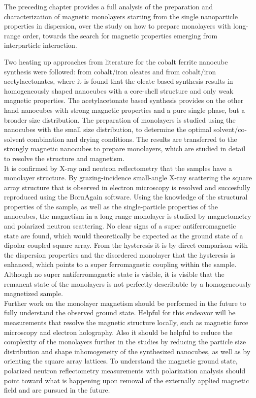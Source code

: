 \documentclass[\main/dresen_thesis.tex]{subfiles}
\begin{document}
  The preceding chapter provides a full analysis of the preparation and characterization of magnetic monolayers starting from the single nanoparticle properties in dispersion, over the study on how to prepare monolayers with long-range order, towards the search for magnetic properties emerging from interparticle interaction.

  Two heating up approaches from literature for the cobalt ferrite nanocube synthesis were followed: from cobalt/iron oleates and from cobalt/iron acetylacetonates, where it is found that the oleate based synthesis results in homogeneously shaped nanocubes with a core-shell structure and only weak magnetic properties.
  The acetylacetonate based synthesis provides on the other hand nanocubes with strong magnetic properties and a pure single phase, but a broader size distribution.
  The preparation of monolayers is studied using the nanocubes with the small size distribution, to determine the optimal solvent/co-solvent combination and drying conditions.
  The results are transferred to the strongly magnetic nanocubes to prepare monolayers, which are studied in detail to resolve the structure and magnetism.
  \\

  It is confirmed by X-ray and neutron reflectometry that the samples have a monolayer structure.
  By grazing-incidence small-angle X-ray scattering the square array structure that is observed in electron microscopy is resolved and succesfully reproduced using the BornAgain software.
  Using the knowledge of the structural properties of the sample, as well as the single-particle properties of the nanocubes, the magnetism in a long-range monolayer is studied by magnetometry and polarized neutron scattering.
  No clear signs of a super antiferromagnetic state are found, which would theoretically be expected as the ground state of a dipolar coupled square array.
  From the hysteresis it is by direct comparison with the dispersion properties and the disordered monolayer that the hysteresis is enhanced, which points to a super ferromagnetic coupling within the sample.
  Although no super antiferromagnetic state is visible, it is visible that the remanent state of the monolayers is not perfectly describable by a homogeneously magnetized sample.
  \\

  Further work on the monolayer magnetism should be performed in the future to fully understand the observed ground state.
  Helpful for this endeavor will be measurements that resolve the magnetic structure locally, such as magnetic force microscopy and electron holography.
  Also it should be helpful to reduce the complexity of the monolayers further in the studies by reducing the particle size distribution and shape inhomogeneity of the synthesized nanocubes, as well as by orienting the square array lattices.
  To understand the magnetic ground state, polarized neutron reflectometry measurements with polarization analysis should point toward what is happening upon removal of the externally applied magnetic field and are pursued in the future.
\end{document}
